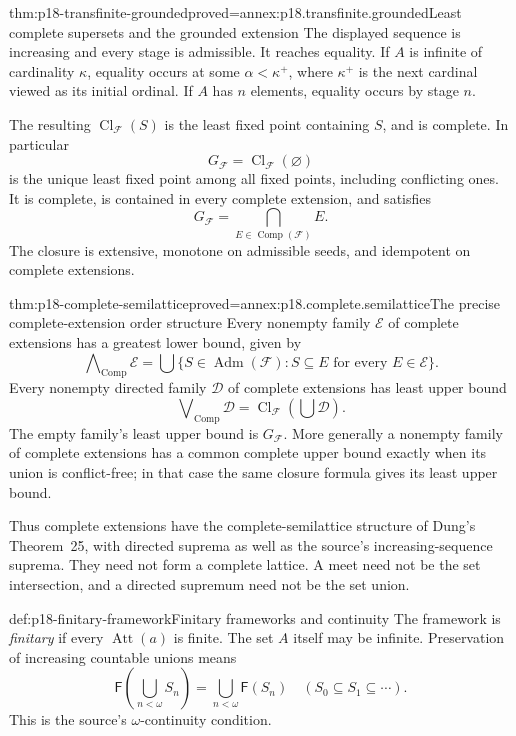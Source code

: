 \begin{hbtheorem}{thm:p18-transfinite-grounded}{proved=annex:p18.transfinite.grounded}{Least complete supersets and the grounded extension}
The displayed sequence is increasing and every stage
is admissible. It reaches equality. If \(A\) is infinite
of cardinality \(\kappa\), equality occurs at some
\(\alpha<\kappa^+\), where \(\kappa^+\) is the next
cardinal viewed as its initial ordinal. If \(A\) has
\(n\) elements, equality occurs by stage \(n\).

The resulting \(\operatorname{Cl}_{\mathcal F}(S)\) is
the least fixed point containing \(S\), and is complete.
In particular
\[
 G_{\mathcal F}=\operatorname{Cl}_{\mathcal F}(\varnothing)
\]
is the unique least fixed point among all fixed points,
including conflicting ones. It is complete, is contained
in every complete extension, and satisfies
\[
 G_{\mathcal F}=\bigcap_{E\in\operatorname{Comp}(\mathcal F)}E.
\]
The closure is extensive, monotone on admissible seeds,
and idempotent on complete extensions.
\end{hbtheorem}

\begin{hbtheorem}{thm:p18-complete-semilattice}{proved=annex:p18.complete.semilattice}{The precise complete-extension order structure}
Every nonempty family \(\mathcal E\) of complete
extensions has a greatest lower bound, given by
\[
 \bigwedge\nolimits_{\operatorname{Comp}}\mathcal E
 =
 \bigcup\{S\in\operatorname{Adm}(\mathcal F):
                           S\subseteq E\text{ for every }E\in\mathcal E\}.
\]
Every nonempty directed family \(\mathcal D\) of
complete extensions has least upper bound
\[
 \bigvee\nolimits_{\operatorname{Comp}}\mathcal D
                  =\operatorname{Cl}_{\mathcal F}\!\left(\bigcup\mathcal D\right).
\]
The empty family's least upper bound is \(G_{\mathcal F}\).
More generally a nonempty family of complete extensions
has a common complete upper bound exactly when its
union is conflict-free; in that case the same closure
formula gives its least upper bound.

Thus complete extensions have the complete-semilattice
structure of Dung's Theorem~25, with directed suprema
as well as the source's increasing-sequence suprema.
They need not form a complete lattice. A meet need
not be the set intersection, and a directed supremum
need not be the set union.
\end{hbtheorem}

\begin{hbdefinition}{def:p18-finitary-framework}{Finitary frameworks and continuity}
The framework is \emph{finitary} if every
\(\operatorname{Att}(a)\) is finite. The set \(A\)
itself may be infinite. Preservation of increasing
countable unions means
\[
 \mathsf F\!\left(\bigcup_{n<\omega}S_n\right)
                  =\bigcup_{n<\omega}\mathsf F(S_n)
                   \quad(S_0\subseteq S_1\subseteq\cdots).
\]
This is the source's \(\omega\)-continuity condition.
\end{hbdefinition}

